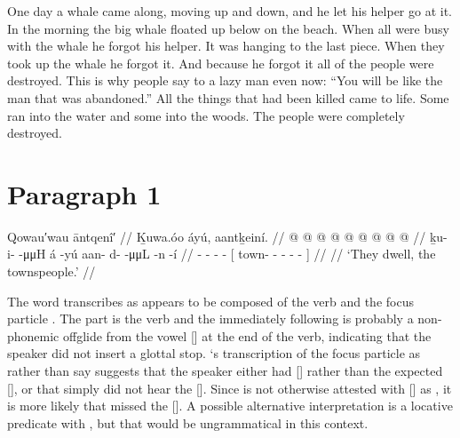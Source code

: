 One day a whale came along, moving up and down, and he let his helper go at it.
In the morning the big whale floated up below on the beach.
When all were busy with the whale he forgot his helper.
It was hanging to the last piece.
When they took up the whale he forgot it.
And because he forgot it all of the people were destroyed.
This is why people say to a lazy man even now: \qqk{}“You will be like the man that was abandoned.” All the things that had been killed came to life.
Some ran into the water and some into the woods.
The people were completely destroyed.

\clearpage
\section{Paragraph 1}\label{sec:90-para-1}

\ex\label{ex:90-1-townspeople-dwell}%
%
\begingl
	\glpreamble	Qowau′wau āntqenî′ //
	\glpreamble	Ḵuwa.óo áyú, aantḵeiní. //
	\gla	{} @ {} @ {} @ {}
		 @ {}
		{}  @ {} @ {} @ {} @ {} @ {} {} //
	\glb	ḵu- i-  -μμH
		á -yú
		{} aan- d-  -μμL -n -í {} //
	\glc	{}- -  -
		 -
		{}[ town- -  - - - {}] //
	\gld	{} {} {} {}
		 {}
		{}  {} {} {} {} {} {} //
	\glft	‘They dwell, the townspeople.’
		//
\endgl
\xe

The word \citeauthor{swanton:1909} transcribes as  appears to be composed of the verb  and the focus particle .
The  part is the verb and the immediately following  is probably a non-phonemic offglide from the vowel [] at the end of the verb, indicating that the speaker did not insert a glottal stop.
\citeauthor{swanton:1909}‘s transcription of the focus particle as  rather than say  suggests that the speaker either had [] rather than the expected [], or that \citeauthor{swanton:1909} simply did not hear the [].
Since  is not otherwise attested with [] as , it is more likely that \citeauthor{swanton:1909} missed the [].
A possible alternative interpretation is a locative predicate   with , but that would be ungrammatical in this context.


